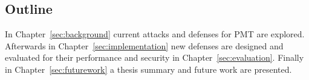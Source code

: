 \subsection{Outline}
In Chapter~\ref{sec:background} current attacks and defenses for \gls{PMT} are explored. Afterwards in Chapter~\ref{sec:implementation} new defenses are designed and evaluated for their performance and security in Chapter~\ref{sec:evaluation}. Finally in Chapter~\ref{sec:futurework} a thesis summary and future work are presented.
